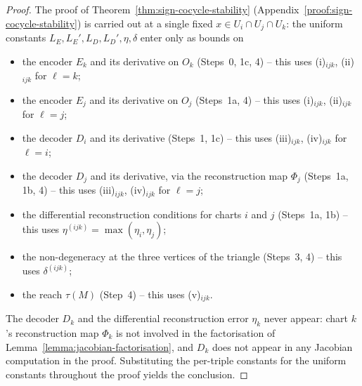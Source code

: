 \documentclass[11pt]{article}
\theoremstyle{plain}
\theoremstyle{definition}
\theoremstyle{remark}
\begin{document}
\begin{proof}
The proof of Theorem~\ref{thm:sign-cocycle-stability} (Appendix~\ref{proof:sign-cocycle-stability}) is carried out at a single fixed $x \in U_i \cap U_j \cap U_k$: the uniform constants $L_E, L_E', L_D, L_D', \eta, \delta$ enter only as bounds on
\begin{itemize}
    \item the encoder $E_k$ and its derivative on $O_k$ (Steps~0, 1c, 4) -- this uses (i)$_{ijk}$, (ii)$_{ijk}$ for $\ell = k$;
    \item the encoder $E_j$ and its derivative on $O_j$ (Steps~1a, 4) -- this uses (i)$_{ijk}$, (ii)$_{ijk}$ for $\ell = j$;
    \item the decoder $D_i$ and its derivative (Steps~1, 1c) -- this uses (iii)$_{ijk}$, (iv)$_{ijk}$ for $\ell = i$;
    \item the decoder $D_j$ and its derivative, via the reconstruction map $\Phi_j$ (Steps~1a, 1b, 4) -- this uses (iii)$_{ijk}$, (iv)$_{ijk}$ for $\ell = j$;
    \item the differential reconstruction conditions for charts $i$ and $j$ (Steps~1a, 1b) -- this uses $\eta^{(ijk)} = \max(\eta_i, \eta_j)$;
    \item the non-degeneracy at the three vertices of the triangle (Steps~3, 4) -- this uses $\delta^{(ijk)}$;
    \item the reach $\tau(M)$ (Step~4) -- this uses (v)$_{ijk}$.
\end{itemize}
The decoder $D_k$ and the differential reconstruction error $\eta_k$ never appear: chart $k$'s reconstruction map $\Phi_k$ is not involved in the factorisation of Lemma~\ref{lemma:jacobian-factorisation}, and $D_k$ does not appear in any Jacobian computation in the proof. Substituting the per-triple constants for the uniform constants throughout the proof yields the conclusion.
\end{proof}
\end{document}
